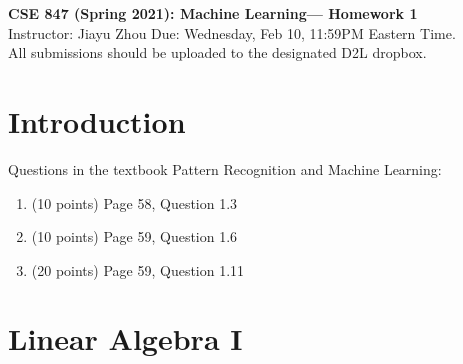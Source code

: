 \documentclass[11pt]{article}
\begin{document}
\thispagestyle {empty}

\newcommand{\lsp}[1]{\large\renewcommand{\baselinestretch}{#1}\normalsize}
\newcommand{\hsp}{\hspace{.2in}}
\newcommand{\comment}[1]{}
\newtheorem{thm}{Theorem}[section]
\newtheorem{lem}{Lemma}[section]
\newtheorem{cor}{Corollary}[section]
\newtheorem{prop}{Proposition}[section]
\newtheorem{problem}{Problem}[section]

\newcommand{\R}{{\rm\hbox{I\kern-.15em R}}}
\newcommand{\IR}{{\rm\hbox{I\kern-.15em R}}}
\newcommand{\IN}{{\rm\hbox{I\kern-.15em N}}}
\newcommand{\IZ}{{\sf\hbox{Z\kern-.40em Z}}}
\newcommand{\IS}{{\rm\hbox{S\kern-.45em S}}}
\newcommand{\Real}{I\!\!R}


\newcommand{\linesep}{\vspace{.2cm}\hrule\vspace{0.2cm}}
\newcommand{\categorysep}{\vspace{0.5cm}}
\newcommand{\entrysep}{\vspace{0cm}}

\newcommand{\category}[1]{\categorysep
                  \noindent {\bf \large #1}
              \linesep}

\pagestyle{empty}

\begin{center}
{\large \textbf{CSE 847 (Spring 2021): Machine Learning--- Homework 1}} \\
 Instructor: Jiayu Zhou \quad Due: Wednesday, Feb 10, 11:59PM Eastern Time. \\
 All submissions should be uploaded to the designated D2L dropbox. 
\end{center}

\section{Introduction}
Questions in the textbook Pattern Recognition and Machine Learning:
\begin{enumerate}
\item (10 points) Page 58, Question 1.3
\item (10 points) Page 59, Question 1.6
\item (20 points) Page 59, Question 1.11
\end{enumerate}

\section{Linear Algebra I}
\end{document}
